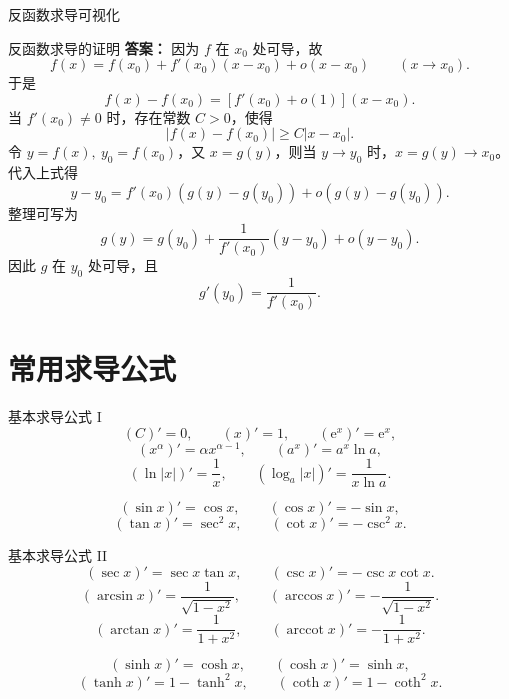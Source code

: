 ﻿\documentclass[aspectratio=169,11pt]{ctexbeamer}
\newcommand{\e}{\mathrm{e}}
\begin{document}
\begin{frame}{反函数求导可视化}
\begin{center}
\end{center}
\end{frame}

\begin{frame}{反函数求导的证明}
\small
\textbf{答案：} 因为 $f$ 在 $x_0$ 处可导，故
\[
f(x)=f(x_0)+f'(x_0)(x-x_0)+o(x-x_0)\qquad (x\to x_0).
\]
于是
\[
f(x)-f(x_0)=[f'(x_0)+o(1)](x-x_0).
\]
当 $f'(x_0)\neq 0$ 时，存在常数 $C>0$，使得
\[
|f(x)-f(x_0)|\ge C|x-x_0|.
\]
令 $y=f(x),\ y_0=f(x_0)$，又 $x=g(y)$，则当 $y\to y_0$ 时，$x=g(y)\to x_0$。代入上式得
\[
y-y_0=f'(x_0)(g(y)-g(y_0))+o(g(y)-g(y_0)).
\]
整理可写为
\[
g(y)=g(y_0)+\frac{1}{f'(x_0)}(y-y_0)+o(y-y_0).
\]
因此 $g$ 在 $y_0$ 处可导，且
\[
g'(y_0)=\frac{1}{f'(x_0)}.
\]
\end{frame}

\section{常用求导公式}

\begin{frame}{基本求导公式 I}
\small
\[
(C)'=0,\qquad (x)'=1,\qquad (\e^x)'=\e^x,
\]
\[
(x^\alpha)'=\alpha x^{\alpha-1},\qquad
(a^x)'=a^x\ln a,
\]
\[
(\ln|x|)'=\frac{1}{x},\qquad
(\log_a|x|)'=\frac{1}{x\ln a}.
\]

\vspace{0.6em}
\[
(\sin x)'=\cos x,\qquad
(\cos x)'=-\sin x,
\]
\[
(\tan x)'=\sec^2 x,\qquad
(\cot x)'=-\csc^2 x.
\]
\end{frame}

\begin{frame}{基本求导公式 II}
\small
\[
(\sec x)'=\sec x\tan x,\qquad
(\csc x)'=-\csc x\cot x.
\]
\[
(\arcsin x)'=\frac{1}{\sqrt{1-x^2}},\qquad
(\arccos x)'=-\frac{1}{\sqrt{1-x^2}}.
\]
\[
(\arctan x)'=\frac{1}{1+x^2},\qquad
(\operatorname{arccot}x)'=-\frac{1}{1+x^2}.
\]

\vspace{0.4em}
\[
(\sinh x)'=\cosh x,\qquad
(\cosh x)'=\sinh x,
\]
\[
(\tanh x)'=1-\tanh^2x,\qquad
(\coth x)'=1-\coth^2x.
\]
\end{frame}
\end{document}
